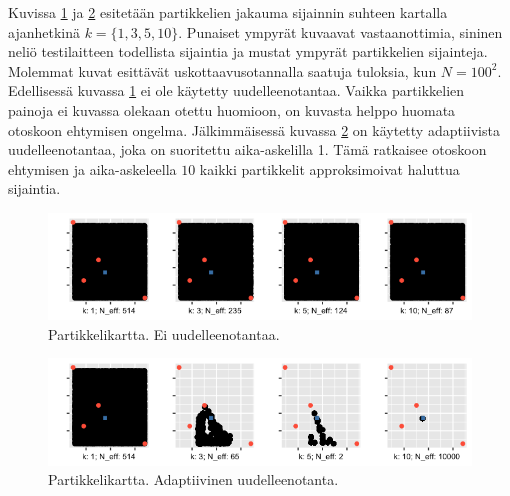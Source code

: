 \documentclass[
  12pt,
  a4paper, twoside]{book}
\begin{document}
\newpage

Kuvissa \ref{fig:noresample_maps} ja \ref{fig:resample_maps} esitetään partikkelien jakauma sijainnin suhteen kartalla ajanhetkinä \(k=\{1,3,5,10\}\). Punaiset ympyrät kuvaavat vastaanottimia, sininen neliö testilaitteen todellista sijaintia ja mustat ympyrät partikkelien sijainteja. Molemmat kuvat esittävät uskottaavusotannalla saatuja tuloksia, kun \(N=100^2\). Edellisessä kuvassa \ref{fig:noresample_maps} ei ole käytetty uudelleenotantaa. Vaikka partikkelien painoja ei kuvassa olekaan otettu huomioon, on kuvasta helppo huomata otoskoon ehtymisen ongelma. Jälkimmäisessä kuvassa \ref{fig:resample_maps} on käytetty adaptiivista uudelleenotantaa, joka on suoritettu aika-askelilla 1. Tämä ratkaisee otoskoon ehtymisen ja aika-askeleella \(10\) kaikki partikkelit approksimoivat haluttua sijaintia.

\begin{figure}[h]
\centering
\includegraphics[width=14cm]{SIS_likelihood_maps}
\caption{Partikkelikartta. Ei uudelleenotantaa.}
\label{fig:noresample_maps}
\end{figure}

\begin{figure}[h]
\centering
\includegraphics[width=14cm]{SIR_likelihood_maps}
\caption{Partikkelikartta. Adaptiivinen uudelleenotanta.}
\label{fig:resample_maps}
\end{figure}
\end{document}
